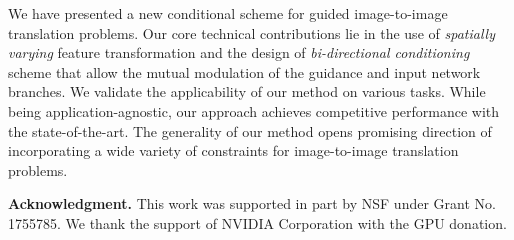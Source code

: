 \documentclass[10pt,twocolumn,letterpaper]{article}
\begin{document}
We have presented a new conditional scheme for guided image-to-image translation problems.
Our core technical contributions lie in the use of \emph{spatially varying} feature transformation and the design of \emph{bi-directional conditioning} scheme that allow the mutual modulation of the guidance and input network branches.
We validate the applicability of our method on various tasks.
While being application-agnostic, our approach achieves competitive performance with the state-of-the-art.
The generality of our method opens promising direction of incorporating a wide variety of constraints for image-to-image translation problems.



\noindent \textbf{Acknowledgment.} This work was supported in part by NSF under Grant No. 1755785. We thank the support of NVIDIA Corporation with the GPU donation. 
{\small


}
\end{document}
